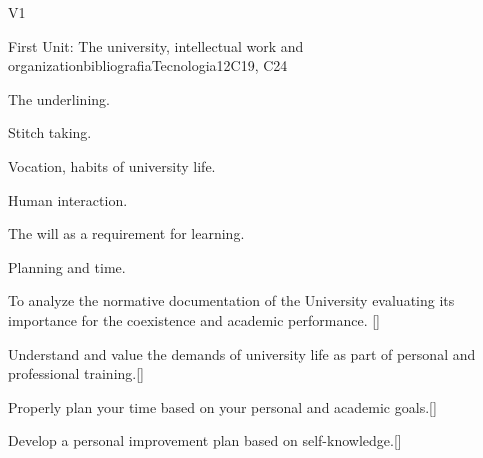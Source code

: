 \begin{syllabus}
\begin{competences}{V1}
    \item {}
    \item {}
\end{competences}

\begin{unit}{}{First Unit: The university, intellectual work and organization}{bibliografiaTecnologia}{12}{C19, C24}
\begin{topics}
        \item The underlining.
        \item Stitch taking.
        \item Vocation, habits of university life.
        \item Human interaction.
        \item The will as a requirement for learning.
        \item Planning and time.
\end{topics}
\begin{learningoutcomes}
        \item To analyze the normative documentation of the University evaluating its importance for the coexistence and academic performance. [\Usage]
        \item Understand and value the demands of university life as part of personal and professional training.[\Usage]
        \item Properly plan your time based on your personal and academic goals.[\Usage]
        \item Develop a personal improvement plan based on self-knowledge.[\Usage]
\end{learningoutcomes}
\end{unit}


\end{syllabus}
